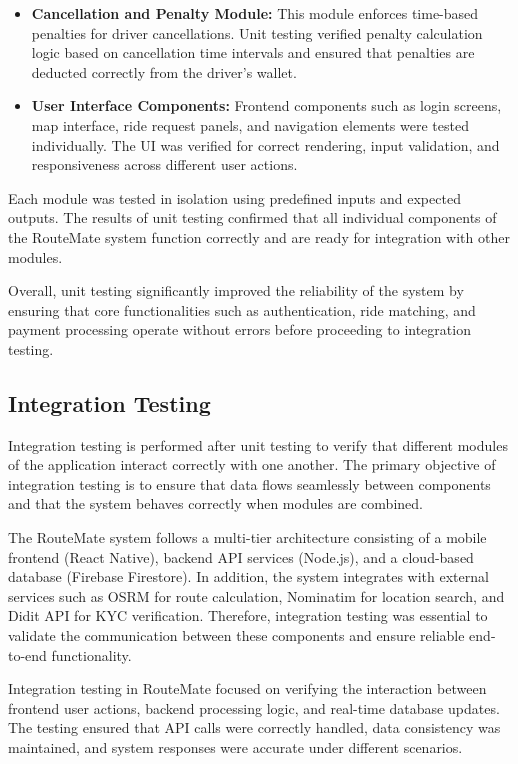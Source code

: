 \documentclass[10pt,a4paper]{report}
\begin{document}
\begin{itemize}
\item \textbf{Cancellation and Penalty Module:}
This module enforces time-based penalties for driver cancellations. Unit testing verified penalty calculation logic based on cancellation time intervals and ensured that penalties are deducted correctly from the driver's wallet.

\item \textbf{User Interface Components:}
Frontend components such as login screens, map interface, ride request panels, and navigation elements were tested individually. The UI was verified for correct rendering, input validation, and responsiveness across different user actions.

\end{itemize}

\justify\large Each module was tested in isolation using predefined inputs and expected outputs. The results of unit testing confirmed that all individual components of the RouteMate system function correctly and are ready for integration with other modules.

\justify\large Overall, unit testing significantly improved the reliability of the system by ensuring that core functionalities such as authentication, ride matching, and payment processing operate without errors before proceeding to integration testing.

\subsection{Integration Testing}

\justify\large Integration testing is performed after unit testing to verify that different modules of the application interact correctly with one another. The primary objective of integration testing is to ensure that data flows seamlessly between components and that the system behaves correctly when modules are combined.

\justify\large The RouteMate system follows a multi-tier architecture consisting of a mobile frontend (React Native), backend API services (Node.js), and a cloud-based database (Firebase Firestore). In addition, the system integrates with external services such as OSRM for route calculation, Nominatim for location search, and Didit API for KYC verification. Therefore, integration testing was essential to validate the communication between these components and ensure reliable end-to-end functionality.

\justify\large Integration testing in RouteMate focused on verifying the interaction between frontend user actions, backend processing logic, and real-time database updates. The testing ensured that API calls were correctly handled, data consistency was maintained, and system responses were accurate under different scenarios.
\end{document}
